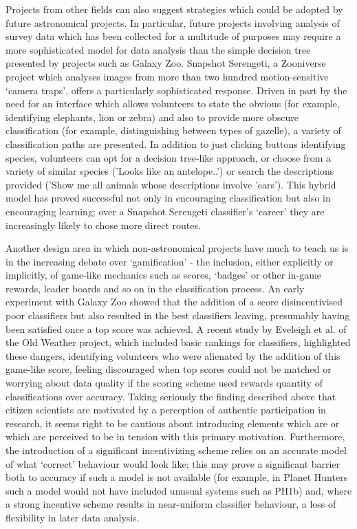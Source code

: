 \documentclass{ar2e}
\begin{document}
Projects from other fields can also suggest strategies which could be adopted by future astronomical projects. In particular, future projects involving analysis of survey data which has been collected for a multitude of purposes may require a more sophisticated model for data analysis than the simple decision tree presented by projects such as Galaxy Zoo. Snapshot Serengeti, a Zooniverse project which analyses images from more than two hundred motion-sensitive `camera traps', offers a particularly sophisticated response. Driven in part by the need for an interface which allows volunteers to state the obvious (for example, identifying elephants, lion or zebra) and also to provide more obscure classification (for example, distinguishing between types of gazelle), a variety of classification paths are presented. In addition to just clicking buttons identifying species, volunteers can opt for a decision tree-like approach, or choose from a variety of similar species ('Looks like an antelope..') or search the descriptions provided ('Show me all animals whose descriptions involve 'ears'). This hybrid model has proved successful not only in encouraging classification but also in encouraging learning; over a Snapshot Serengeti classifier's `career' they are increasingly likely to chose more direct routes.

Another design area in which non-astronomical projects have much to teach us is in the increasing debate over `gamification' - the inclusion, either explicitly or implicitly, of game-like mechanics such as scores, `badges' or other in-game rewards, leader boards and so on in the classification process. An early experiment with Galaxy Zoo showed that the addition of a score disincentivised poor classifiers but also resulted in the best classifiers leaving, presumably having been satisfied once a top score was achieved. A recent study by Eveleigh et al. of the Old Weather project, which included basic rankings for classifiers, highlighted these dangers, identifying volunteers who were alienated by the addition of this game-like score, feeling discouraged when top scores could not be matched or worrying about data quality if the scoring scheme used rewards quantity of classifications over accuracy. Taking seriously the finding described above that citizen scientists are motivated by a perception of authentic participation in research, it seems right to be cautious about introducing elements which are or which are perceived to be in tension with this primary motivation. Furthermore, the introduction of a significant incentivizing scheme relies on an accurate model of what `correct' behaviour would look like; this may prove a significant barrier both to accuracy if such a model is not available (for example, in Planet Hunters such a model would not have included unusual systems such as PH1b) and, where a strong incentive scheme results in near-uniform classifier behaviour, a loss of flexibility in later data analysis. 
\end{document}
